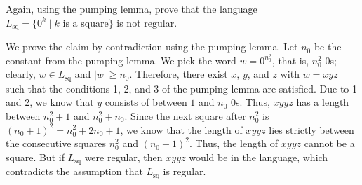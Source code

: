 \documentclass{exercise}
\begin{document}
\subtask Again, using the pumping lemma, prove that the language
  $L_{\text{sq}}=\{0^k \mid k \text{ is a square}\}$ is not regular.

  \begin{solution}
    We prove the claim by contradiction using the pumping lemma.  Let $n_0$ be
    the constant from the pumping lemma.  We pick the word $w = 0^{n_0^2}$,
    that is, $n_0^2$ $0$s; clearly, $w\in L_{\text{sq}}$ and $|w|\ge n_0$.
    Therefore, there exist $x$, $y$, and $z$  with $w = xyz$ such that the
    conditions 1, 2, and 3 of the pumping lemma are satisfied.   Due
    to 1 and 2, we know that $y$ consists of between $1$ and $n_0$ $0$s.
    Thus, $xyyz$ has a length between $n_0^2 + 1$ and $n_0^2 + n_0$.  Since the
    next square after $n_0^2$ is $(n_0+1)^2 = n_0^2 + 2n_0 + 1$, we know that
    the length of $xyyz$ lies strictly between the consecutive squares $n_0^2$
    and $(n_0+1)^2$.  Thus, the length of $xyyz$ cannot be a square.  But if
    $L_{\text{sq}}$ were regular, then $xyyz$ would be in the language, which
    contradicts the assumption that $L_{\text{sq}}$ is regular.
  \end{solution}
\end{document}
